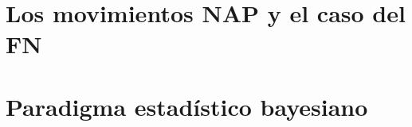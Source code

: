 \documentclass[oneside,10pt,review,usenames,dvipsnames]{book}
\theoremstyle{definition}
\begin{document}

\frontmatter











\tableofcontents




\mainmatter 

\pagestyle{fancy}
	\fancyhf{}
	\rhead{\thepage}
	\fancyhead[L]{\nouppercase{\leftmark}}

\part{Los movimientos NAP y el caso del FN} 
	
	
	
	

\part{Paradigma estadístico bayesiano}

	
	
	

	


\appendix
\end{document}
